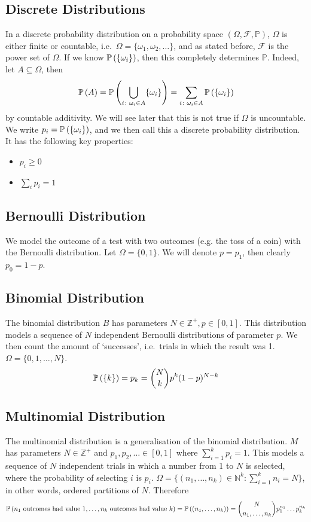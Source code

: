 \subsection{Discrete Distributions}
In a discrete probability distribution on a probability space \((\Omega, \mathcal F, \mathbb P)\), \(\Omega\) is either finite or countable, i.e.\ \(\Omega = \{ \omega_1, \omega_2, \dots \}\), and as stated before, \(\mathcal F\) is the power set of \(\Omega\). If we know \(\mathbb{P}\left({\{\omega_i\}}\right)\), then this completely determines \(\mathbb P\). Indeed, let \(A \subseteq \Omega\), then
\[ \mathbb{P}\left({A}\right) = \mathbb{P}\left({\bigcup_{i \colon \omega_i \in A} \{ \omega_i \}}\right) = \sum_{i \colon \omega_i \in A}\mathbb{P}\left({\{\omega_i\}}\right) \]
by countable additivity. We will see later that this is not true if \(\Omega\) is uncountable. We write \(p_i = \mathbb{P}\left({\{\omega_i\}}\right)\), and we then call this a discrete probability distribution. It has the following key properties:
\begin{itemize}
	\item \(p_i \geq 0\)
	\item \(\sum_i p_i = 1\)
\end{itemize}

\subsection{Bernoulli Distribution}
We model the outcome of a test with two outcomes (e.g. the toss of a coin) with the Bernoulli distribution. Let \(\Omega = \{ 0, 1 \}\). We will denote \(p = p_1\), then clearly \(p_0 = 1 - p\).

\subsection{Binomial Distribution}
The binomial distribution \(B\) has parameters \(N \in \mathbb Z^+, p \in [0, 1]\). This distribution models a sequence of \(N\) independent Bernoulli distributions of parameter \(p\). We then count the amount of `successes', i.e.\ trials in which the result was 1. \(\Omega = \{ 0, 1, \dots, N \}\).
\[ \mathbb{P}\left({\{ k \}}\right) = p_k = \binom{N}{k}p^k(1-p)^{N-k} \]

\subsection{Multinomial Distribution}
The multinomial distribution is a generalisation of the binomial distribution. \(M\) has parameters \(N \in \mathbb Z^+\) and \(p_1, p_2, \dots \in [0, 1]\) where \(\sum_{i=1}^k p_i = 1\). This models a sequence of \(N\) independent trials in which a number from 1 to \(N\) is selected, where the probability of selecting \(i\) is \(p_i\). \(\Omega = \{ (n_1, \dots, n_k) \in \mathbb N^k \colon \sum_{i=1}^k n_i = N \}\), in other words, ordered partitions of \(N\). Therefore
\[ \mathbb{P}\left({n_1 \text{ outcomes had value 1}, \dots, n_k \text{ outcomes had value }k}\right) = \mathbb{P}\left({(n_1, \dots, n_k)}\right) = \binom{N}{n_1,\dots,n_k}p_1^{n_1}\dots p_k^{n_k} \]

